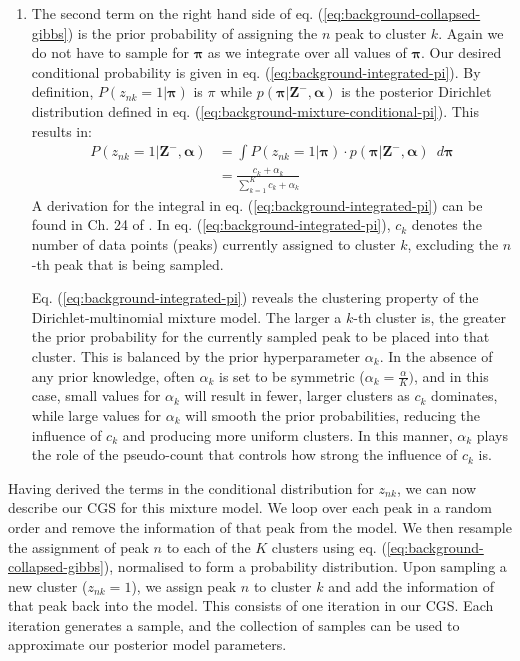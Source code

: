 \begin{enumerate}
\item The second term on the right hand side of eq. (\ref{eq:background-collapsed-gibbs}) is the prior probability of assigning the $n$ peak to cluster $k$. Again we do not have to sample for $\boldsymbol{\pi}$ as we integrate over all values of $\boldsymbol{\pi}$. Our desired conditional probability is given in eq. (\ref{eq:background-integrated-pi}). By definition, $P(z_{nk}=1 \vert \boldsymbol{\pi})$ is $\pi$ while $p(\boldsymbol{\pi} \vert \boldsymbol{Z}^{-}, \boldsymbol{\alpha})$ is the posterior Dirichlet distribution defined in eq. (\ref{eq:background-mixture-conditional-pi}). This results in:
\begin{equation}
\begin{aligned}
P(z_{nk}=1 \vert \boldsymbol{Z}^{-}, \boldsymbol{\alpha}) &= \int P(z_{nk}=1 \vert \boldsymbol{\pi}) \cdot p(\boldsymbol{\pi} \vert \boldsymbol{Z}^{-}, \boldsymbol{\alpha}) \enspace d\boldsymbol{\pi} \\
                                                                                         &= \frac{c_k + \alpha_k}{\sum_{k=1}^K c_{k} + \alpha_k}
\label{eq:background-integrated-pi}
\end{aligned}
\end{equation}
A derivation for the integral in eq. (\ref{eq:background-integrated-pi}) can be found in Ch. 24 of \cite{murphy2012machine}. In eq. (\ref{eq:background-integrated-pi}), $c_{k}$ denotes the number of data points (peaks) currently assigned to cluster $k$,  excluding the $n$-th peak that is being sampled. 

Eq. (\ref{eq:background-integrated-pi}) reveals the clustering property of the Dirichlet-multinomial mixture model. The larger a $k$-th cluster is, the greater the prior probability for the currently sampled peak to be placed into that cluster. This is balanced by the prior hyperparameter $\alpha_k$. In the absence of any prior knowledge, often $\alpha_k$ is set to be symmetric ($\alpha_k=\frac{\alpha}{K})$, and in this case, small values for $\alpha_k$ will result in fewer, larger clusters as $c_k$ dominates, while large values for $\alpha_k$ will smooth the prior probabilities, reducing the influence of $c_k$ and producing more uniform clusters. In this manner, $\alpha_k$ plays the role of the pseudo-count that controls how strong the influence of $c_k$ is. 
\end{enumerate}

Having derived the terms in the conditional distribution for $z_{nk}$, we can now describe our CGS for this mixture model. We loop over each peak in a random order and remove the information of that peak from the model. We then resample the assignment of peak $n$ to each of the $K$ clusters using eq. (\ref{eq:background-collapsed-gibbs}), normalised to form a probability distribution. Upon sampling a new cluster ($z_{nk}=1$), we assign peak $n$ to cluster $k$ and add the information of that peak back into the model. This consists of one iteration in our CGS. Each iteration generates a sample, and the collection of samples can be used to approximate our posterior model parameters.

